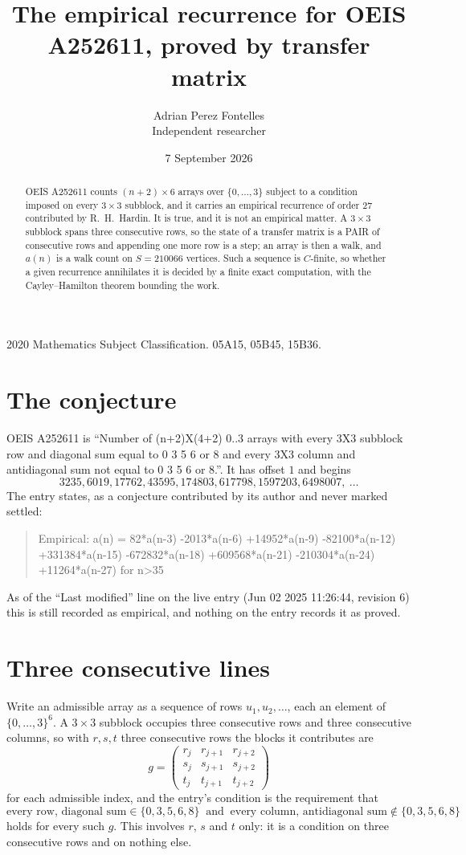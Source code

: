\documentclass[11pt,a4paper]{article}
\title{The empirical recurrence for OEIS A252611, proved by transfer matrix}
\author{Adrian Perez Fontelles\\ \small Independent researcher}
\date{7 September 2026}
\theoremstyle{plain}
\theoremstyle{definition}
\begin{document}
\maketitle

\begin{abstract}
OEIS A252611 counts $(n+2)\times6$ arrays over $\{0,\dots,3\}$ subject to a condition imposed on
every $3\times3$ subblock, and it carries an empirical recurrence of order $27$
contributed by R.~H.~Hardin. It is true, and it is not an empirical matter. A $3\times3$
subblock spans three consecutive rows, so the state of a transfer matrix is a PAIR of
consecutive rows and appending one more row is a step; an array is then a walk, and
$a(n)$ is a walk count on $S=210066$ vertices. Such a sequence is $C$-finite, so whether a given
recurrence annihilates it is decided by a finite exact computation, with the Cayley--Hamilton
theorem bounding the work.
\end{abstract}

\noindent\small 2020 Mathematics Subject Classification. 05A15, 05B45, 15B36.\normalsize

\section{The conjecture}

OEIS A252611 is ``Number of (n+2)X(4+2) 0..3 arrays with every 3X3 subblock row and diagonal sum equal to 0 3 5 6 or 8 and every 3X3 column and antidiagonal sum not equal to 0 3 5 6 or 8.''. It has offset $1$ and begins
\[
3235, 6019, 17762, 43595, 174803, 617798, 1597203, 6498007,\ \dots
\]
The entry states, as a conjecture contributed by its author and never marked settled:
\begin{quote}
Empirical: a(n) = 82*a(n-3) -2013*a(n-6) +14952*a(n-9) -82100*a(n-12) +331384*a(n-15) -672832*a(n-18) +609568*a(n-21) -210304*a(n-24) +11264*a(n-27) for n>35
\end{quote}
As of the ``Last modified'' line on the live entry (Jun 02 2025 11:26:44, revision 6) this is still
recorded as empirical, and nothing on the entry records it as proved.

\section{Three consecutive lines}

Write an admissible array as a sequence of rows $u_1,u_2,\dots$, each an element of
$\{0,\dots,3\}^{6}$. A $3\times3$ subblock occupies three consecutive rows and
three consecutive columns, so with $r,s,t$ three consecutive rows the blocks it
contributes are
\[
g=\begin{pmatrix}r_j&r_{j+1}&r_{j+2}\\ s_j&s_{j+1}&s_{j+2}\\ t_j&t_{j+1}&t_{j+2}\end{pmatrix}
\]
for each admissible index, and the entry's condition is the requirement that
\[
\text{every row, diagonal sum} \in \{0,3,5,6,8\}\ \text{ and }\ \text{every column, antidiagonal sum} \notin \{0,3,5,6,8\}
\]
holds for every such $g$. This involves $r$, $s$ and $t$ only: it is a condition on
three consecutive rows and on nothing else.
\end{document}
